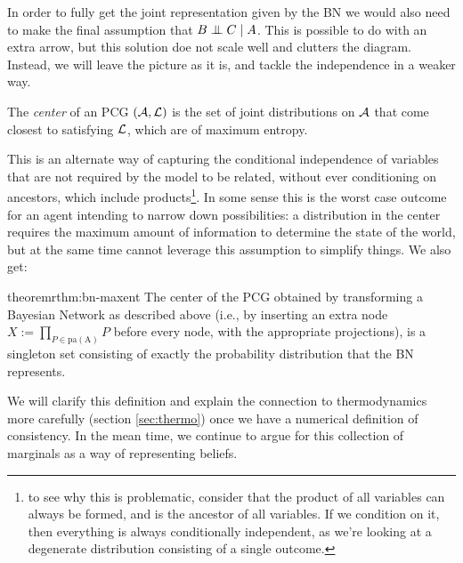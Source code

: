 \documentclass{article}
\begin{document}
	In order to fully get the joint representation given by the BN we would also need to make the final assumption that $B \mathrel{\perp\mspace{-10mu}\perp} C \mid A$. This is possible to do with an extra arrow, but this solution doe not scale well and clutters the diagram. Instead, we will leave the picture as it is, and tackle the independence in a weaker way.
	
	\begin{defn*}
		The \emph{center} of an PCG $(\cal A, L)$ is the set of joint distributions on $\cal A$ that come closest to satisfying $\cal L$, which are of maximum entropy.
	\end{defn*}
	
	This is an alternate way of capturing the conditional independence of variables that are not required by the model to be related, without ever conditioning on ancestors, which include products\footnote{to see why this is problematic, consider that the product of all variables can always be formed, and is the ancestor of all variables. If we condition on it, then everything is always conditionally independent, as we're looking at a degenerate distribution consisting of a single outcome.}.  In some sense this is the worst case outcome for an agent intending to narrow down possibilities: a distribution in the center requires the maximum amount of information to determine the state of the world, but at the same time cannot leverage this assumption to simplify things. %
	We also get:
	
	
	\begin{restatable}{theorem}{rthm:bn-maxent} \label{rthm:bn-maxent}
		The center of the PCG obtained by transforming a Bayesian Network as described above (i.e., by inserting an extra node $X := \prod_{P \in \mathrm{pa(A)}} P$ before every node, with the appropriate projections), is a singleton set consisting of exactly the probability distribution that the BN represents.
	\end{restatable}
	

	
	We will clarify this definition and explain the connection to thermodynamics more carefully (section \ref{sec:thermo}) once we have a numerical definition of consistency. In the mean time, we continue to argue for this collection of marginals as a way of representing beliefs.
	
\end{document}
